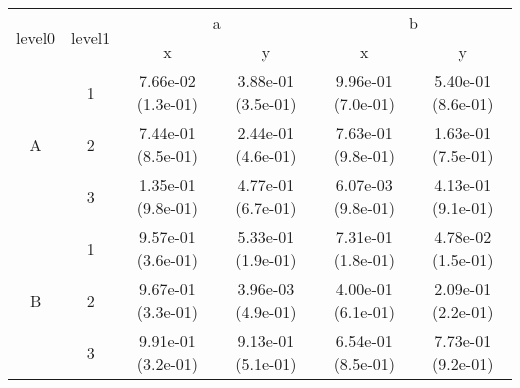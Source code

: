 \begin{tabular}{cccccc}
\toprule
\multirow{2}{*}{level0} & \multirow{2}{*}{level1}&\multicolumn{2}{c}{a}&\multicolumn{2}{c}{b}\tabularnewline
\cmidrule(lr){3-4}
\cmidrule(lr){5-6}
&&x&y&x&y\tabularnewline
\midrule
\multirow{3}{*}{A}&1& 7.66e-02 (1.3e-01)& 3.88e-01 (3.5e-01)& 9.96e-01 (7.0e-01)& 5.40e-01 (8.6e-01)\tabularnewline
&2& 7.44e-01 (8.5e-01)& 2.44e-01 (4.6e-01)& 7.63e-01 (9.8e-01)& 1.63e-01 (7.5e-01)\tabularnewline
&3& 1.35e-01 (9.8e-01)& 4.77e-01 (6.7e-01)& 6.07e-03 (9.8e-01)& 4.13e-01 (9.1e-01)\tabularnewline
\midrule
\multirow{3}{*}{B}&1& 9.57e-01 (3.6e-01)& 5.33e-01 (1.9e-01)& 7.31e-01 (1.8e-01)& 4.78e-02 (1.5e-01)\tabularnewline
&2& 9.67e-01 (3.3e-01)& 3.96e-03 (4.9e-01)& 4.00e-01 (6.1e-01)& 2.09e-01 (2.2e-01)\tabularnewline
&3& 9.91e-01 (3.2e-01)& 9.13e-01 (5.1e-01)& 6.54e-01 (8.5e-01)& 7.73e-01 (9.2e-01)\tabularnewline
\bottomrule
\end{tabular}
